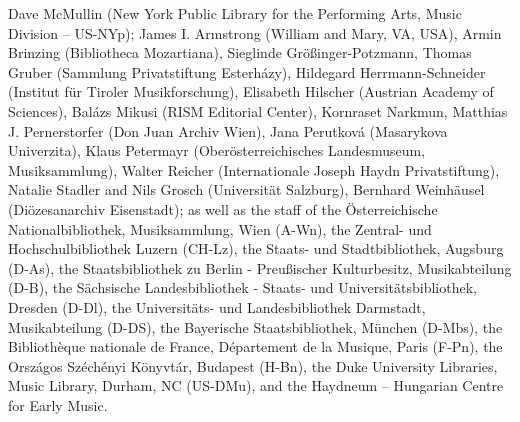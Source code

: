 \documentclass{ees}
\begin{document}
Dave McMullin (New York Public Library for the Performing Arts, Music Division – US-NYp);
James I. Armstrong (William and Mary, VA, USA),
Armin Brinzing (Bibliotheca Mozartiana),
Sieglinde Größinger-Potzmann,
Thomas Gruber (Sammlung Privatstiftung Esterházy),
Hildegard Herrmann-Schneider (Institut für Tiroler Musikforschung),
Elisabeth Hilscher (Austrian Academy of Sciences),
Balázs Mikusi (RISM Editorial Center),
Kornraset Narkmun,
Matthias J. Pernerstorfer (Don Juan Archiv Wien),
Jana Perutková (Masarykova Univerzita),
Klaus Petermayr (Oberösterreichisches Landesmuseum, Musiksammlung),
Walter Reicher (Internationale Joseph Haydn Privatstiftung),
Natalie Stadler and Nils Grosch (Universität Salzburg),
Bernhard Weinhäusel (Diözesanarchiv Eisenstadt);
as well as the staff of
the Österreichische Nationalbibliothek, Musiksammlung, Wien (A-Wn),
the Zentral- und Hochschulbibliothek Luzern (CH-Lz),
the Staats- und Stadtbibliothek, Augsburg (D-As),
the Staatsbibliothek zu Berlin - Preußischer Kulturbesitz, Musikabteilung (D-B),
the Sächsische Landesbibliothek - Staats- und Universitätsbibliothek, Dresden (D-Dl),
the Universitäts- und Landesbibliothek Darmstadt, Musikabteilung (D-DS),
the Bayerische Staatsbibliothek, München (D-Mbs),
the Bibliothèque nationale de France, Département de la Musique, Paris (F-Pn),
the Országos Széchényi Könyvtár, Budapest (H-Bn),
the Duke University Libraries, Music Library, Durham, NC (US-DMu),
and the Haydneum – Hungarian Centre for Early Music.


\clearpage
{}
\end{document}
